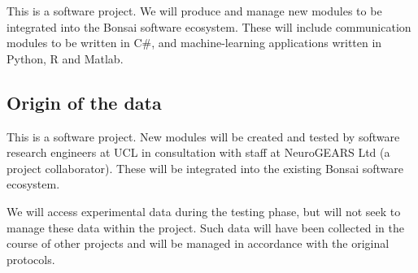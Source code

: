 \documentclass[a4paper,11pt]{article}
\begin{document}

This is a software project.  We will produce and manage new modules to be integrated into the Bonsai software ecosystem.  These will include communication modules to be written in C\#, and machine-learning applications written in Python, R and Matlab.


\subsection{Origin of the data}


This is a software project.  New modules will be created and tested by software research engineers at UCL in consultation with staff at NeuroGEARS Ltd (a project collaborator).  These will be integrated into the existing Bonsai software ecosystem.

We will access experimental data during the testing phase, but will not seek to manage these data within the project.  Such data will have been collected in the course of other projects and will be managed in accordance with the original protocols. 

\end{document}
